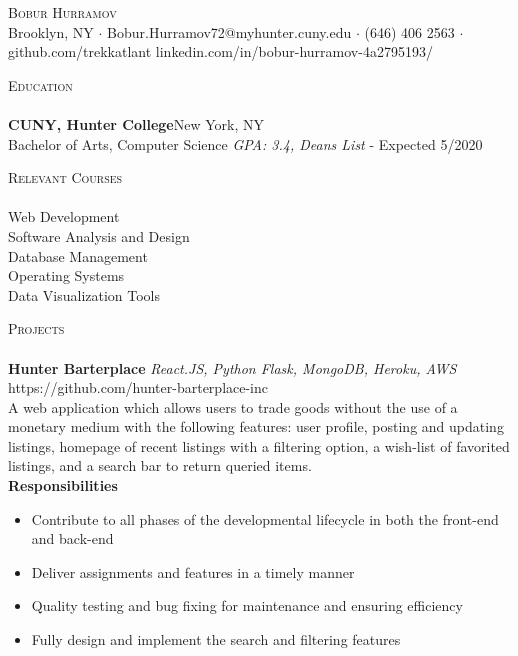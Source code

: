 \documentclass[a4paper]{article}
\newcommand{\lineunder} {
    \vspace*{-8pt} \\
    \hspace*{-18pt} \hrulefill \\
}
\newcommand{\header} [1] {
    {\hspace*{-18pt}\vspace*{6pt} \textsc{#1}}
    \vspace*{-6pt} \lineunder
}
\begin{document}
\vspace*{-40pt}

    

\vspace*{-10pt}
\begin{center}
	{\Huge \scshape {Bobur Hurramov}}\\
	Brooklyn, NY $\cdot$ Bobur.Hurramov72@myhunter.cuny.edu $\cdot$ (646) 406 2563 $\cdot$ github.com/trekkatlant linkedin.com/in/bobur-hurramov-4a2795193/\\
\end{center}

\header{Education}
\textbf{CUNY, Hunter College}\hfill New York, NY\\
Bachelor of Arts, Computer Science \textit{GPA: 3.4, Dean\textquotesingle{}s List} \hfill  - Expected 5/2020\\
\vspace{2mm}

\header{Relevant Courses}
Web Development\\
\vspace*{2mm}
Software Analysis and Design\\
\vspace*{2mm}
Database Management\\
\vspace*{2mm}
Operating Systems\\
\vspace*{2mm}
Data Visualization Tools\\
\vspace*{2mm}

\header{Projects}
{\textbf{Hunter Barterplace}} {\sl React.JS, Python Flask, MongoDB, Heroku, AWS} \hfill https://github.com/hunter-barterplace-inc\\
A web application which allows users to trade goods without the use of a monetary medium with the following features: user profile, posting and updating listings, homepage of recent listings with a filtering option, a wish-list of favorited listings, and a search bar to return queried items.\\
\vspace*{2mm}
{\textbf{Responsibilities}}\\
\vspace{-1mm}
\begin{itemize} \itemsep 1pt
	\item Contribute to all phases of the developmental lifecycle in both the front-end and back-end
	\item Deliver assignments and features in a timely manner
	\item Quality testing and bug fixing for maintenance and ensuring efficiency
	\item Fully design and implement the search and filtering features
\end{itemize}
\end{document}

